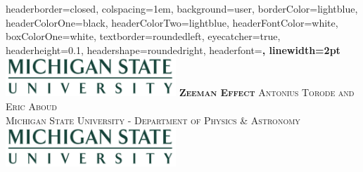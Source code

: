 \documentclass[landscape,a0paper,fontscale=0.285]{baposter} %
\begin{document}
\begin{poster}
{
headerborder=closed, %
colspacing=1em, %
background=user,
borderColor=lightblue, %
headerColorOne=black, %
headerColorTwo=lightblue, %
headerFontColor=white, %
boxColorOne=white, %
textborder=roundedleft, %
eyecatcher=true, %
headerheight=0.1\textheight, %
headershape=roundedright, %
headerfont=\Large\bf\textsc, %
linewidth=2pt %
}
%
{\includegraphics[height=4em]{MSU.jpg}} %
{\bf\textsc{Zeeman Effect}\vspace{0.5em}} %
{\textsc{Antonius Torode and Eric Aboud \\ Michigan State University - Department of Physics \& Astronomy}} %
{\includegraphics[height=4em]{MSU.jpg}} %



\end{poster}
\end{document}
